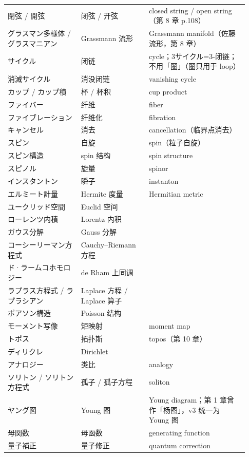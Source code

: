 \begin{longtable}{@{}>{\raggedright\arraybackslash}p{0.29\linewidth}>{\raggedright\arraybackslash}p{0.26\linewidth}>{\raggedright\arraybackslash}p{0.38\linewidth}@{}}
閉弦 / 開弦 & \mbox{闭弦} / \mbox{开弦} & closed string / open string（第 8 章 p.108） \\
グラスマン多様体 / グラスマニアン & Grassmann \mbox{流形} & Grassmann manifold（佐藤流形，第 8 章） \\
サイクル & \mbox{闭链} & cycle；3サイクル=3-闭链；不用「圈」（圈只用于 loop） \\
消滅サイクル & \mbox{消没闭链} & vanishing cycle \\
カップ / カップ積 & \mbox{杯} / \mbox{杯积} & cup product \\
ファイバー & \mbox{纤维} & fiber \\
ファイブレーション & \mbox{纤维化} & fibration \\
キャンセル & \mbox{消去} & cancellation（临界点消去） \\
スピン & \mbox{自旋} & spin（粒子自旋） \\
スピン構造 & spin \mbox{结构} & spin structure \\
スピノル & \mbox{旋量} & spinor \\
インスタントン & \mbox{瞬子} & instanton \\
エルミート計量 & Hermite \mbox{度量} & Hermitian metric \\
ユークリッド空間 & Euclid \mbox{空间} &  \\
ローレンツ内積 & Lorentz \mbox{内积} &  \\
ガウス分解 & Gauss \mbox{分解} &  \\
コーシー\textendash{}リーマン方程式 & Cauchy--Riemann \mbox{方程} &  \\
ド·ラームコホモロジー & de Rham \mbox{上同调} &  \\
ラプラス方程式 / ラプラシアン & Laplace \mbox{方程} / Laplace \mbox{算子} &  \\
ポアソン構造 & Poisson \mbox{结构} &  \\
モーメント写像 & \mbox{矩映射} & moment map \\
トポス & \mbox{拓扑斯} & topos（第 10 章） \\
ディリクレ & Dirichlet &  \\
アナロジー & \mbox{类比} & analogy \\
ソリトン / ソリトン方程式 & \mbox{孤子} / \mbox{孤子方程} & soliton \\
ヤング図 & Young \mbox{图} & Young diagram；第 1 章曾作「杨图」，v3 统一为 Young 图 \\
母関数 & \mbox{母函数} & generating function \\
量子補正 & \mbox{量子修正} & quantum correction \\

\end{longtable}
